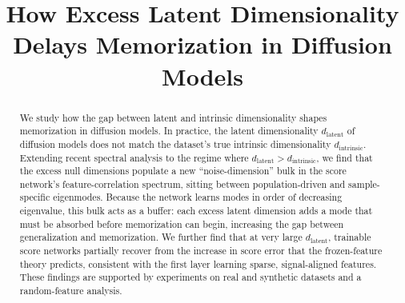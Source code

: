 \documentclass[final]{hld2026} %
\title[How Excess Latent Dimensionality Delays Memorization in Diffusion Models]{How Excess Latent Dimensionality Delays Memorization in Diffusion Models}
\newcommand{\dlat}{d_{\mathrm{latent}}}
\newcommand{\dint}{d_{\mathrm{intrinsic}}}
\begin{document}
\maketitle

\begin{abstract}%
We study how the gap between latent and intrinsic dimensionality
shapes memorization in diffusion models. In practice, the latent
dimensionality $\dlat$ of diffusion models does not match the
dataset's true intrinsic dimensionality $\dint$. Extending recent spectral analysis to the
regime where $\dlat > \dint$, we find that the excess null dimensions populate a new ``noise-dimension'' bulk in the score network's feature-correlation spectrum, sitting between population-driven and sample-specific eigenmodes. Because the network learns modes in order of decreasing eigenvalue, this bulk acts as a buffer: each excess latent dimension adds a mode that must be absorbed before memorization can begin, increasing the gap between generalization and memorization. We further find that at very large $\dlat$, trainable score networks partially recover from the increase in score error that the frozen-feature theory predicts, consistent with the first layer learning sparse, signal-aligned features. These findings are supported by experiments on real and synthetic datasets and a random-feature analysis.
\end{abstract}










\end{document}

